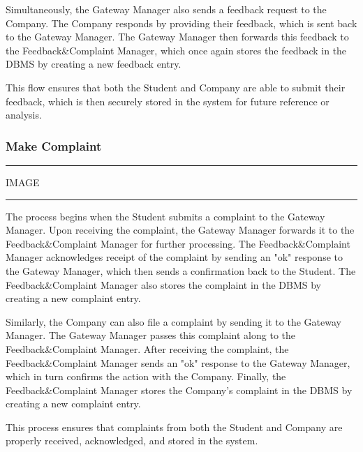 Simultaneously, the Gateway Manager also sends a feedback request to the Company. The Company responds by providing their feedback, which is sent back to the Gateway Manager. The Gateway Manager then forwards this feedback to the Feedback\&Complaint Manager, which once again stores the feedback in the DBMS by creating a new feedback entry.

This flow ensures that both the Student and Company are able to submit their feedback, which is then securely stored in the system for future reference or analysis.

\subsubsection{Make Complaint}

\vspace{20pt}
\hrule
\vspace{10pt}
IMAGE
\vspace{10pt}
\hrule
\vspace{20pt}

The process begins when the Student submits a complaint to the Gateway Manager. Upon receiving the complaint, the Gateway Manager forwards it to the Feedback\&Complaint Manager for further processing. The Feedback\&Complaint Manager acknowledges receipt of the complaint by sending an "ok" response to the Gateway Manager, which then sends a confirmation back to the Student. The Feedback\&Complaint Manager also stores the complaint in the DBMS by creating a new complaint entry.

Similarly, the Company can also file a complaint by sending it to the Gateway Manager. The Gateway Manager passes this complaint along to the Feedback\&Complaint Manager. After receiving the complaint, the Feedback\&Complaint Manager sends an "ok" response to the Gateway Manager, which in turn confirms the action with the Company. Finally, the Feedback\&Complaint Manager stores the Company's complaint in the DBMS by creating a new complaint entry.

This process ensures that complaints from both the Student and Company are properly received, acknowledged, and stored in the system.

